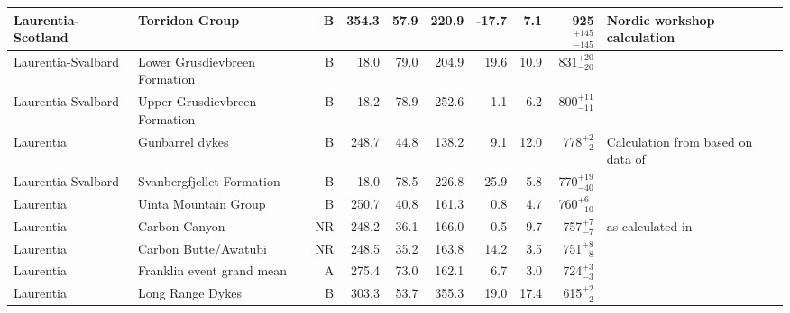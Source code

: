 \begin{longtable}{p{1 in}p{1 in}rrrrrrrp{1.5 in}}
            Laurentia-Scotland &                                   Torridon Group &      B &     354.3 &      57.9 & 220.9 & -17.7 &       7.1 &  925$^{+145}_{-145}$ &                        Nordic workshop calculation \\ \hline
            Laurentia-Svalbard &                    Lower Grusdievbreen Formation &      B &      18.0 &      79.0 & 204.9 &  19.6 &      10.9 &    831$^{+20}_{-20}$ &                                 \cite{Maloof2006a} \\ \hline
            Laurentia-Svalbard &                    Upper Grusdievbreen Formation &      B &      18.2 &      78.9 & 252.6 &  -1.1 &       6.2 &    800$^{+11}_{-11}$ &                                 \cite{Maloof2006a} \\ \hline
            Laurentia &                                  Gunbarrel dykes &      B &     248.7 &      44.8 & 138.2 &   9.1 &      12.0 &      778$^{+2}_{-2}$ &  Calculation from \cite{Eyster2019a} based on data of \cite{Harlan1993a, Harlan1997a}  \\ \hline
   Laurentia-Svalbard &                        Svanbergfjellet Formation &      B &      18.0 &      78.5 & 226.8 &  25.9 &       5.8 &    770$^{+19}_{-40}$ &                                 \cite{Maloof2006a} \\ \hline
            Laurentia &                             Uinta Mountain Group &      B &     250.7 &      40.8 & 161.3 &   0.8 &       4.7 &     760$^{+6}_{-10}$ &                                   \cite{Weil2006b} \\ \hline
            Laurentia &                                    Carbon Canyon &     NR &     248.2 &      36.1 & 166.0 &  -0.5 &       9.7 &      757$^{+7}_{-7}$ &  \cite{Weil2004a} as calculated in \cite{Eyster2019a} \\ \hline
            Laurentia &                             Carbon Butte/Awatubi &     NR &     248.5 &      35.2 & 163.8 &  14.2 &       3.5 &      751$^{+8}_{-8}$ &                                 \cite{Eyster2019a} \\                   Laurentia &                        Franklin event grand mean &      A &     275.4 &      73.0 & 162.1 &   6.7 &       3.0 &      724$^{+3}_{-3}$ &                               \cite{Denyszyn2009a} \\ \hline
                     Laurentia &                                 Long Range Dykes &      B &     303.3 &      53.7 & 355.3 &  19.0 &      17.4 &      615$^{+2}_{-2}$ &                                 \cite{Murthy1992a} \\ \hline

\end{longtable}
